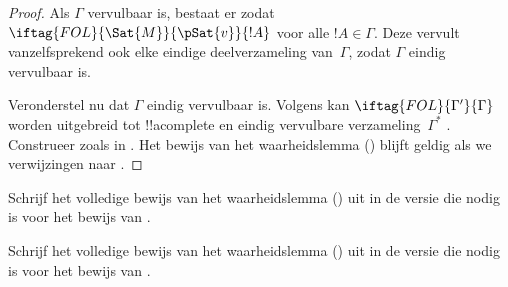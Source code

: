 \documentclass[../../../include/open-logic-section]{subfiles}
\begin{document}
\begin{proof}
Als $\Gamma$ vervulbaar is, bestaat er
zodat $\iftag{FOL}{\Sat{M}}{\pSat{v}}{!A}$ voor alle $!A \in \Gamma$.
Deze  vervult vanzelfsprekend ook
elke eindige deelverzameling van~$\Gamma$, zodat $\Gamma$ eindig
vervulbaar is.

Veronderstel nu dat $\Gamma$ eindig vervulbaar is. Volgens
 kan $\iftag{FOL}{\Gamma'}{\Gamma}$ worden
uitgebreid tot !!a{complete} en eindig vervulbare verzameling~$\Gamma^*$
. Construeer
zoals in . Het bewijs van het
waarheidslemma () blijft geldig als we verwijzingen
naar .
\end{proof}

\begin{prob}
Schrijf het volledige bewijs van het waarheidslemma
() uit in de versie die nodig is voor
het bewijs van .
\end{prob}
\tagendprob

\begin{prob}
Schrijf het volledige bewijs van het waarheidslemma
() uit in de versie die nodig is voor
het bewijs van .
\end{prob}
\tagendprob
\end{document}
